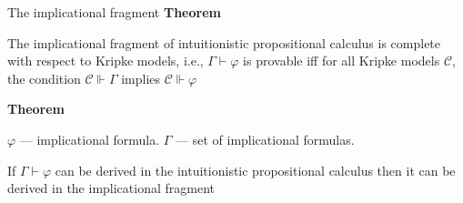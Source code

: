 \documentclass[sans]{beamer}
\begin{document}
\begin{frame}{The implicational fragment}
  \textbf{Theorem}

  The implicational fragment of intuitionistic propositional calculus is complete
  with respect to Kripke models, i.e., $\Gamma \vdash \varphi$ is provable iff for all Kripke
  models $\mathcal{C}$, the condition $\mathcal{C} \Vdash \Gamma$ implies $\mathcal{C} \Vdash \varphi$
  
  \vfill

  \pause
  \textbf{Theorem}

  $\varphi$ --- implicational formula. $\Gamma$ --- set of implicational formulas.

  If $\Gamma \vdash \varphi$ can be derived in the intuitionistic propositional calculus then
  it can be derived in the implicational fragment
\end{frame}
\end{document}
